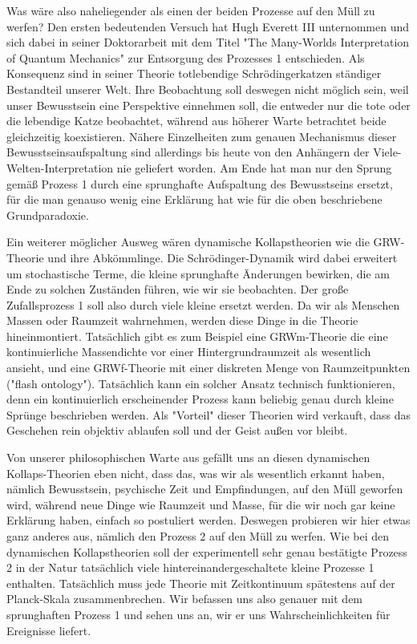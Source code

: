 \documentclass[12pt]{book}
\begin{document}
Was wäre also naheliegender als einen der beiden Prozesse auf den Müll zu werfen? Den ersten bedeutenden Versuch hat Hugh Everett III unternommen und sich dabei in seiner Doktorarbeit mit dem Titel "The Many-Worlds Interpretation
of Quantum Mechanics" zur Entsorgung des Prozesses 1 entschieden. Als Konsequenz sind in seiner Theorie totlebendige Schrödingerkatzen ständiger Bestandteil unserer Welt. Ihre Beobachtung soll deswegen nicht möglich sein, weil unser Bewusstsein eine Perspektive einnehmen soll, die entweder nur die tote oder die lebendige Katze beobachtet, während aus höherer Warte betrachtet beide gleichzeitig koexistieren. Nähere Einzelheiten zum genauen Mechanismus dieser Bewusstseinsaufspaltung sind allerdings bis heute von den Anhängern der Viele-Welten-Interpretation nie geliefert worden. Am Ende hat man nur den Sprung gemäß Prozess 1 durch eine sprunghafte Aufspaltung des Bewusstseins ersetzt, für die man genauso wenig eine Erklärung hat wie für die oben beschriebene Grundparadoxie.

Ein weiterer möglicher Ausweg wären dynamische Kollapstheorien wie die GRW-Theorie und ihre Abkömmlinge. Die Schrödinger-Dynamik wird dabei erweitert um stochastische Terme, die kleine sprunghafte Änderungen bewirken, die am Ende zu solchen Zuständen führen, wie wir sie beobachten. Der große Zufallsprozess 1 soll also durch viele kleine ersetzt werden. Da wir als Menschen Massen oder Raumzeit wahrnehmen, werden diese Dinge in die Theorie hineinmontiert. Tatsächlich gibt es zum Beispiel eine GRWm-Theorie die eine kontinuierliche Massendichte vor einer Hintergrundraumzeit als wesentlich ansieht, und eine GRWf-Theorie mit einer diskreten Menge von Raumzeitpunkten ("flash ontology"). Tatsächlich kann ein solcher Ansatz technisch funktionieren, denn ein kontinuierlich erscheinender Prozess kann beliebig genau durch kleine Sprünge beschrieben werden. Als "Vorteil" dieser Theorien wird verkauft, dass das Geschehen rein objektiv ablaufen soll und der Geist außen vor bleibt. 

Von unserer philosophischen Warte aus gefällt uns an diesen dynamischen Kollaps-Theorien eben nicht, dass das, was wir als wesentlich erkannt haben, nämlich Bewusstsein, psychische Zeit und Empfindungen, auf den Müll geworfen wird, während neue Dinge wie Raumzeit und Masse, für die wir noch gar keine Erklärung haben, einfach so postuliert werden. Deswegen probieren wir hier etwas ganz anderes aus, nämlich den Prozess 2 auf den Müll zu werfen. Wie bei den dynamischen Kollapstheorien soll der experimentell sehr genau bestätigte Prozess 2 in der Natur tatsächlich viele hintereinandergeschaltete kleine Prozesse 1 enthalten. Tatsächlich muss jede Theorie mit Zeitkontinuum spätestens auf der Planck-Skala zusammenbrechen. Wir befassen uns also genauer mit dem sprunghaften Prozess 1 und sehen uns an, wir er uns Wahrscheinlichkeiten für Ereignisse liefert.
\end{document}
